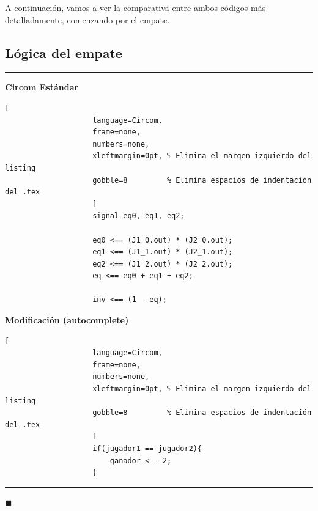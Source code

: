 \documentclass[a4paper,12pt]{report}
\begin{document}
	\vspace{0.2cm}
	\noindent A continuación, vamos a ver la comparativa entre ambos códigos más detalladamente, comenzando por el empate.
	
	\subsection{Lógica del empate}
	\begin{mi_ejemplo}
		\caption{Traducción de la lógica de empate}
		\label{ej:empate}
		\begin{center}
			\rule{\textwidth}{0.6pt} 
			\begin{minipage}[t][6cm][t]{0.48\textwidth}
				\raggedright %
				\textbf{Circom Estándar} \\
				\vspace{0.2cm}
				\begin{lstlisting}[
					language=Circom, 
					frame=none, 
					numbers=none, 
					xleftmargin=0pt, % Elimina el margen izquierdo del listing
					gobble=8         % Elimina espacios de indentación del .tex
					]
					signal eq0, eq1, eq2;
					
					eq0 <== (J1_0.out) * (J2_0.out);
					eq1 <== (J1_1.out) * (J2_1.out);
					eq2 <== (J1_2.out) * (J2_2.out);  
					eq <== eq0 + eq1 + eq2;       
					
					inv <== (1 - eq);
				\end{lstlisting}
			\end{minipage}
			\hfill
			\begin{minipage}[t][4.5cm][t]{0.48\textwidth}
				\raggedright 
				\textbf{Modificación (autocomplete)} \\
				\vspace{0.2cm}
				\begin{lstlisting}[
					language=Circom, 
					frame=none, 
					numbers=none, 
					xleftmargin=0pt, % Elimina el margen izquierdo del listing
					gobble=8         % Elimina espacios de indentación del .tex
					]
					if(jugador1 == jugador2){ 
						ganador <-- 2;
					}
				\end{lstlisting}
			\end{minipage}
			\rule{\textwidth}{0.8pt} 
		\end{center}
		
		\hspace*{\fill} $\blacksquare$
	\end{mi_ejemplo}
	
\end{document}
